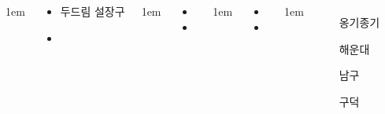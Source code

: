 \documentclass[	20pt, 
							a1paper, 
							portrait, %
							margin=0mm, %
							innermargin=10mm,  		%
							colspace=5mm, 
							subcolspace=0mm
							]{tikzposter}
\begin{document}
\begin{columns}
			{
					\setlength{\leftmargini}{4em}
					\setlength{\labelsep} {1em}
				\begin{LARGE}
					\begin{itemize}
					\item 두드림 설장구
					\item 
					\end{itemize}
				\end{LARGE}
			}

			{
					\setlength{\leftmargini}{4em}
					\setlength{\labelsep} {1em}
				\begin{LARGE}
					\begin{itemize}
					\item 
					\item 
					\end{itemize}
				\end{LARGE}
			}


			{
					\setlength{\leftmargini}{4em}
					\setlength{\labelsep} {1em}
				\begin{LARGE}
					\begin{itemize}
					\item 
					\item 
					\end{itemize}
				\end{LARGE}
			}





			{
					\setlength{\leftmargini}{10em}
					\setlength{\labelsep} {1em}
					\begin{itemize}
					\item [옹기종기] 
					\item [해운대] 
					\item [남구] 
					\item [구덕] 


\end{itemize}}
\end{columns}
\end{document}
